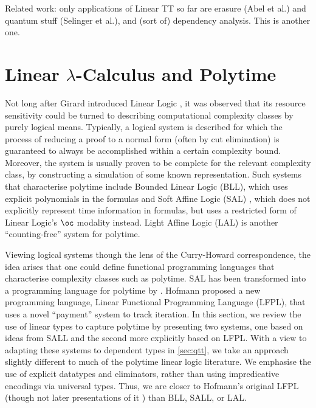 \documentclass[acmsmall,review]{acmart}
\begin{document}
Related work: only applications of Linear TT so far are erasure (Abel
et al.) and quantum stuff (Selinger et al.), and (sort of) dependency
analysis. This is another one.

\section{Linear $\lambda$-Calculus and Polytime}
\label{sec:linear-intro}

Not long after Girard introduced Linear Logic \cite{girard87}, it was
observed that its resource sensitivity could be turned to describing
computational complexity classes by purely logical means. Typically, a
logical system is described for which the process of reducing a proof
to a normal form (often by cut elimination) is guaranteed to always be
accomplished within a certain complexity bound. Moreover, the system
is usually proven to be complete for the relevant complexity class, by
constructing a simulation of some known representation. Such systems
that characterise polytime include Bounded Linear Logic (BLL), which
uses explicit polynomials in the formulas \cite{bll} and Soft Affine
Logic (SAL) \cite{lafont}, which does not explicitly represent
time information in formulas, but uses a restricted form of Linear
Logic's $\oc$ modality instead. Light Affine Logic (LAL) \cite{lal} is
another ``counting-free'' system for polytime.

Viewing logical systems though the lens of the Curry-Howard
correspondence, the idea arises that one could define functional
programming languages that characterise complexity classes such as
polytime. SAL has been transformed into a programming language for
polytime by \cite{gaboardi}. Hofmann proposed a new programming
language, Linear Functional Programming Language (LFPL), that uses a
novel ``payment'' system to track iteration. In this section, we
review the use of linear types to capture polytime by presenting two
systems, one based on ideas from SALL and the second more explicitly
based on LFPL. With a view to adapting these systems to dependent
types in \autoref{sec:qtt}, we take an approach slightly different to
much of the polytime linear logic literature. We emphasise the use of
explicit datatypes and eliminators, rather than using impredicative
encodings via universal types. Thus, we are closer to Hofmann's
original LFPL (though not later presentations of it
\cite{dallago-hofmann}) than BLL, SALL, or LAL.
\end{document}
